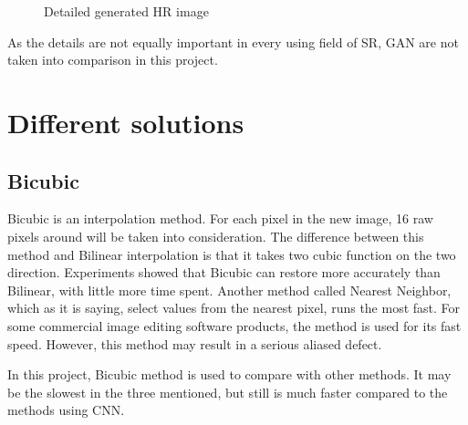 \documentclass{article}
\begin{document}
  \begin{figure}[H]
      \centering
      \caption{Detailed generated HR image}
  \end{figure}
  As the details are not equally important in every using field of SR, GAN are not taken into comparison in this project.
  
  
  
  
  \section{Different solutions} 
  \subsection{Bicubic}
  Bicubic is an interpolation method. For each pixel in the new image, 16 raw pixels around will be taken into consideration.
  The difference between this method and Bilinear interpolation is that it takes two cubic function on the two direction.
  Experiments showed that Bicubic can restore more accurately than Bilinear, with little more time spent.
  Another method called Nearest Neighbor, which as it is saying, select values from the nearest pixel, runs the most fast.
  For some commercial image editing software products, the method is used for its fast speed. However, this method may result in a serious aliased defect.
  
  In this project, Bicubic method is used to compare with other methods.
  It may be the slowest in the three mentioned, but still is much faster compared to the methods using CNN.
  
\end{document}
